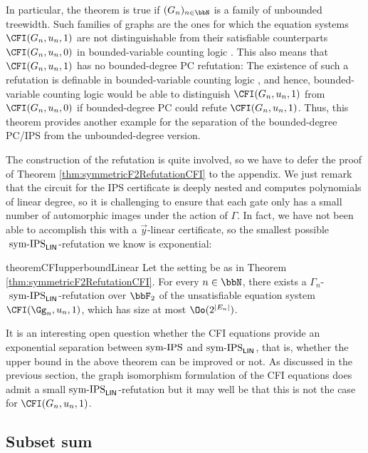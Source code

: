 \documentclass[a4paper,UKenglish,cleveref, autoref, thm-restate]{lipics-v2021}
\newcommand{\symIPS}{\text{ \upshape sym-IPS}}
\newcommand{\symIPSlin}{\text{ \upshape sym-IPS}_{\mathsf{LIN}}}
\begin{document}
In particular, the theorem is true if $(G_n)_{n \in \bbN}$ is a family of unbounded treewidth. Such families of graphs are the ones for which the equation systems $\CFI(G_n, u_n, 1)$ are not distinguishable from their satisfiable counterparts $\CFI(G_n, u_n, 0)$ in bounded-variable counting logic \cite{atseriasBulatovDawar}.
This also means that $\CFI(G_n, u_n, 1)$ has no bounded-degree PC refutation: The existence of such a refutation is definable in bounded-variable counting logic \cite{ggpp}, and hence, bounded-variable counting logic would be able to distinguish $\CFI(G_n, u_n, 1)$ from $\CFI(G_n, u_n, 0)$ if bounded-degree PC could refute $\CFI(G_n, u_n, 1)$. Thus, this theorem provides another example for the separation of the bounded-degree PC/IPS from the unbounded-degree version.

The construction of the refutation is quite involved, so we have to defer the proof of Theorem \ref{thm:symmetricF2RefutationCFI} to the appendix. We just remark that the circuit for the IPS certificate is deeply nested and computes polynomials of linear degree, so it is challenging to ensure that each gate only has a small number of automorphic images under the action of $\Gamma$. In fact, we have not been able to accomplish this with a $\vec{y}$-linear certificate, so the smallest possible$\symIPSlin{}$-refutation we know is exponential:
\begin{restatable}{theorem}{CFIupperboundLinear}
	\label{thm:symHilbertLikeCFI}
	Let the setting be as in Theorem \ref{thm:symmetricF2RefutationCFI}.
	For every $n \in \bbN$, there exists a $\Gamma_n$-$\symIPSlin$-refutation over $\bbF_2$ of the unsatisfiable equation system $\CFI(\Gg_n, u_n, 1)$, which has size at most $\Oo(2^{|E_n|})$.
\end{restatable}	
It is an interesting open question whether the CFI equations provide an exponential separation between$\symIPS{}$ and$\symIPSlin{}$, that is, whether the upper bound in the above theorem can be improved or not. As discussed in the previous section, the graph isomorphism formulation of the CFI equations does admit a small$\symIPSlin{}$-refutation but it may well be that this is not the case for $\CFI(G_n, u_n, 1)$.




\subsection{Subset sum}
\end{document}
